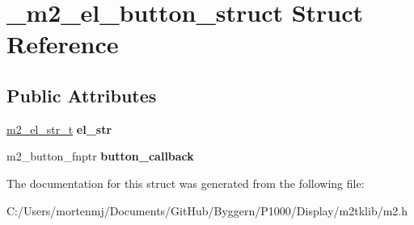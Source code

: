 \hypertarget{struct__m2__el__button__struct}{\section{\-\_\-m2\-\_\-el\-\_\-button\-\_\-struct Struct Reference}
\label{struct__m2__el__button__struct}
}
\subsection*{Public Attributes}
\begin{DoxyCompactItemize}
\item 
\hypertarget{struct__m2__el__button__struct_ad99b0f8b9f57c0fec0e0de9368482821}{\hyperlink{struct__m2__el__str__struct}{m2\-\_\-el\-\_\-str\-\_\-t} {\bfseries el\-\_\-str}}\label{struct__m2__el__button__struct_ad99b0f8b9f57c0fec0e0de9368482821}

\item 
\hypertarget{struct__m2__el__button__struct_a813aa9492847d30bed95642685ca7ee8}{m2\-\_\-button\-\_\-fnptr {\bfseries button\-\_\-callback}}\label{struct__m2__el__button__struct_a813aa9492847d30bed95642685ca7ee8}

\end{DoxyCompactItemize}


The documentation for this struct was generated from the following file\-:\begin{DoxyCompactItemize}
\item 
C\-:/\-Users/mortenmj/\-Documents/\-Git\-Hub/\-Byggern/\-P1000/\-Display/m2tklib/m2.\-h\end{DoxyCompactItemize}
